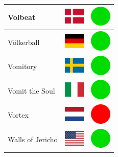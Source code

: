 \documentclass[12pt, a4paper, twoside]{report}
\begin{document}
\begin{center}
\begin{longtable}{|p{5cm}|p{2cm}|p{2cm}|}
Volbeat & \includegraphics[width=1cm]{4x3/dk} & \includegraphics[width=1cm]{likes/y} \\ \hline
Völkerball & \includegraphics[width=1cm]{4x3/de} & \includegraphics[width=1cm]{likes/y} \\ \hline
Vomitory & \includegraphics[width=1cm]{4x3/se} & \includegraphics[width=1cm]{likes/y} \\ \hline
Vomit the Soul & \includegraphics[width=1cm]{4x3/it} & \includegraphics[width=1cm]{likes/y} \\ \hline
Vortex & \includegraphics[width=1cm]{4x3/nl} & \includegraphics[width=1cm]{likes/n} \\ \hline
Walls of Jericho & \includegraphics[width=1cm]{4x3/us} & \includegraphics[width=1cm]{likes/y} \\ \hline

\end{longtable}
\end{center}
\end{document}
